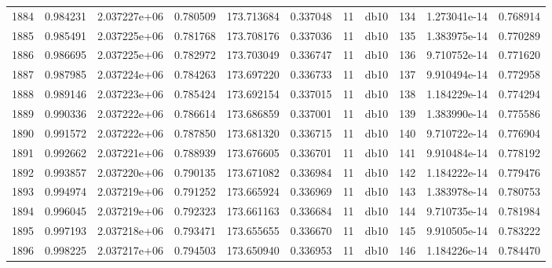 \begin{tabular}{lrrrrrrlrrr}
1884 &    0.984231 &        2.037227e+06 &  0.780509 &              173.713684 &    0.337048 &      11 &         db10 &    134 &   1.273041e-14 &      0.768914 \\
1885 &    0.985491 &        2.037225e+06 &  0.781768 &              173.708176 &    0.337036 &      11 &         db10 &    135 &   1.383975e-14 &      0.770289 \\
1886 &    0.986695 &        2.037225e+06 &  0.782972 &              173.703049 &    0.336747 &      11 &         db10 &    136 &   9.710752e-14 &      0.771620 \\
1887 &    0.987985 &        2.037224e+06 &  0.784263 &              173.697220 &    0.336733 &      11 &         db10 &    137 &   9.910494e-14 &      0.772958 \\
1888 &    0.989146 &        2.037223e+06 &  0.785424 &              173.692154 &    0.337015 &      11 &         db10 &    138 &   1.184229e-14 &      0.774294 \\
1889 &    0.990336 &        2.037222e+06 &  0.786614 &              173.686859 &    0.337001 &      11 &         db10 &    139 &   1.383990e-14 &      0.775586 \\
1890 &    0.991572 &        2.037222e+06 &  0.787850 &              173.681320 &    0.336715 &      11 &         db10 &    140 &   9.710722e-14 &      0.776904 \\
1891 &    0.992662 &        2.037221e+06 &  0.788939 &              173.676605 &    0.336701 &      11 &         db10 &    141 &   9.910484e-14 &      0.778192 \\
1892 &    0.993857 &        2.037220e+06 &  0.790135 &              173.671082 &    0.336984 &      11 &         db10 &    142 &   1.184222e-14 &      0.779476 \\
1893 &    0.994974 &        2.037219e+06 &  0.791252 &              173.665924 &    0.336969 &      11 &         db10 &    143 &   1.383978e-14 &      0.780753 \\
1894 &    0.996045 &        2.037219e+06 &  0.792323 &              173.661163 &    0.336684 &      11 &         db10 &    144 &   9.710735e-14 &      0.781984 \\
1895 &    0.997193 &        2.037218e+06 &  0.793471 &              173.655655 &    0.336670 &      11 &         db10 &    145 &   9.910505e-14 &      0.783222 \\
1896 &    0.998225 &        2.037217e+06 &  0.794503 &              173.650940 &    0.336953 &      11 &         db10 &    146 &   1.184226e-14 &      0.784470 \\

\end{tabular}
